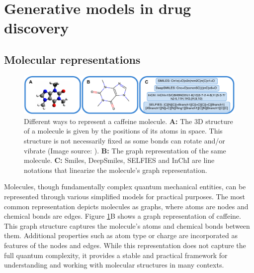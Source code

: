 \section{Generative models in drug discovery}
\subsection{Molecular representations}
\begin{figure}
	\centering
	\includegraphics[width=\textwidth]{figures/representations/representations.pdf}
	\caption{Different ways to represent a caffeine molecule. \textbf{A:} The 3D structure of a
		molecule is given by the positions of its atoms in space. This structure is not
		necessarily fixed as some bonds can rotate and/or vibrate (Image source:
		\citep{Caffeine3DStructure2010}). \textbf{B:} The graph representation of the same
		molecule. \textbf{C:} Smiles, DeepSmiles, SELFIES and InChI are line notations that
		linearize the molecule's graph representation.\label{fig:molecular-graph}}
\end{figure}
Molecules, though fundamentally complex quantum mechanical entities, can be represented through
various simplified models for practical purposes. The most common representation depicts molecules
as graphs, where atoms are nodes and chemical bonds are edges. Figure \ref{fig:molecular-graph}B
shows a graph representation of caffeine. This graph structure captures the molecule's atoms
and chemical bonds between them. Additional properties such as atom type or charge are
incorporated as features of the nodes and edges. While this representation does not capture the full
quantum complexity, it provides a stable and practical framework for understanding and working with
molecular structures in many contexts.

